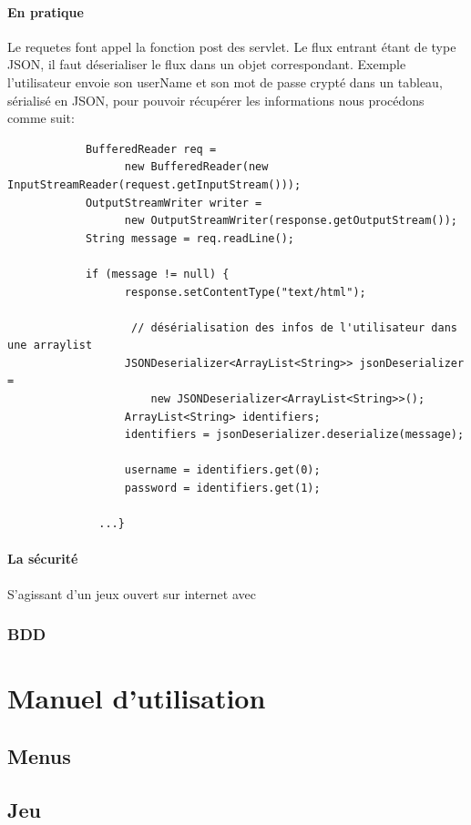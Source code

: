 \documentclass[]{report}
\begin{document}
		
		\subsubsection{En pratique}
		
		Le requetes font appel la fonction post des servlet. Le flux entrant étant de
		type JSON, il faut déserialiser le flux dans un objet correspondant. Exemple
		l'utilisateur envoie son userName et son mot de passe crypté dans un tableau,
		sérialisé en JSON, pour pouvoir récupérer les informations nous procédons
		comme suit: 
		
		\begin{verbatim}
			BufferedReader req = 
				  new BufferedReader(new InputStreamReader(request.getInputStream()));
			OutputStreamWriter writer = 
				  new OutputStreamWriter(response.getOutputStream());
			String message = req.readLine();
			
			if (message != null) {
				  response.setContentType("text/html");
				
				   // désérialisation des infos de l'utilisateur dans une arraylist 
				  JSONDeserializer<ArrayList<String>> jsonDeserializer = 
					  new JSONDeserializer<ArrayList<String>>();
				  ArrayList<String> identifiers;
				  identifiers = jsonDeserializer.deserialize(message);
				
				  username = identifiers.get(0);
				  password = identifiers.get(1);
				  
			  ...}
		\end{verbatim}
		
		
		\subsubsection{La sécurité}
		S'agissant d'un jeux ouvert sur internet avec 
		
		
		\subsection{BDD}
		
		
\chapter{Manuel d'utilisation}
	\section{Menus}
	\section{Jeu}
\end{document}

